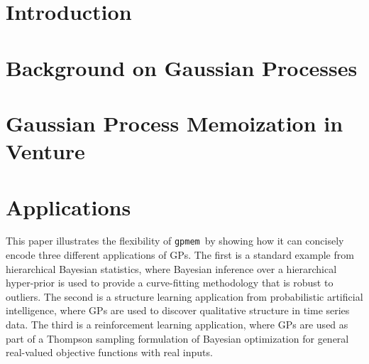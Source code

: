 \documentclass[twoside,11pt]{article}
\newcommand{\gpmem}{\texttt{gpmem}}
\newcommand{\myparagraph}[1]{\paragraph{#1}\mbox{}\\}
\begin{document}
\section{Introduction}

%
%

%

\section{Background on Gaussian Processes}


%

\section{Gaussian Process Memoization in Venture}


\section{Applications}
This paper illustrates the flexibility of \gpmem\ by showing how it can concisely encode three different applications of \ac{GP}s.
The first is a standard example from hierarchical Bayesian statistics, where Bayesian inference over a hierarchical hyper-prior is used to provide a curve-fitting methodology that is robust to outliers.
The second is a structure learning application from probabilistic artificial intelligence, where \ac{GP}s are used to discover qualitative structure in time series data.
The third is a reinforcement learning application, where \ac{GP}s are used as part of a Thompson sampling formulation of Bayesian optimization for general real-valued objective functions with real inputs.
\end{document}
